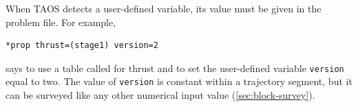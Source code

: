When TAOS detects a user-defined variable, its value must be given in the problem
file. For example,

\begin{lstlisting}[style=taosmanual]
*prop thrust=(stage1) version=2
\end{lstlisting}

says to use a table called  for thrust and to set the user-defined
variable \texttt{version} equal to two. The value of \texttt{version} is constant within
a trajectory segment, but it can be surveyed like any other numerical input value
(\cref{sec:block-survey}).

